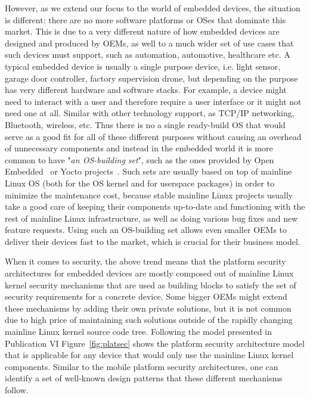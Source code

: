 However, as we extend our focus to the world of embedded devices, the situation is different: there are no more software platforms or OSes that dominate this market. This is due to a very different nature of how embedded devices are designed and produced by OEMs, as well to a much wider set of use cases that such devices must support, such as automation, automotive, healthcare etc. A typical embedded device is usually a single purpose device, i.e. light sensor, garage door controller, factory supervision drone, but depending on the purpose has very different hardware and software stacks. For example, a device might need to interact with a user and therefore require a user interface or it might not need one at all. Similar with other technology support, as TCP/IP networking, Bluetooth, wireless, etc. 
Thus there is no a single ready-build OS that would serve as a good fit for all of these different purposes without causing an overhead of unnecessary components and instead in the embedded world it is more common to have "\textit{an OS-building set}", such as the ones provided by Open Embedded~\cite{OE2017} or Yocto projects~\cite{yocto2017}. Such sets are usually based on top of mainline Linux OS (both for the OS kernel and for userspace packages) in order to minimize the maintenance cost, because stable mainline Linux projects usually take a good care of keeping their components up-to-date and functioning with the rest of mainline Linux infrastructure, as well as doing various bug fixes and new feature requests. Using such an OS-building set allows even smaller OEMs to deliver their devices fast to the market, which is crucial for their business model. 

When it comes to security, the above trend means that the platform security architectures for embedded devices are mostly composed out of mainline Linux kernel security mechanisms that are used as building blocks to satisfy the set of security requirements for a concrete device. Some bigger OEMs might extend these mechanisms by adding their own private solutions, but it is not common due to high price of maintaining such solutions outside of the rapidly changing mainline Linux kernel source code tree. Following the model presented in Publication VI Figure~\ref{fig:platsec} shows the platform security architecture model that is applicable for any device that would only use the mainline Linux kernel components. Similar to the mobile platform security architectures, one can identify a set of well-known design patterns that these different mechanisms follow.



